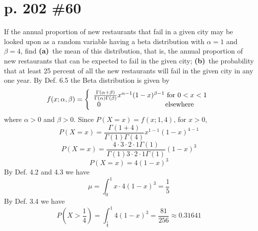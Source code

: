 \documentclass[12pt]{article}
\begin{document}
	\section[20pt]{p. 202 \#60}
	If the annual proportion of new restaurants that fail in a given city may be looked upon as a random variable having a beta distribution with \(\alpha=1\) and \(\beta=4\), find \newline
	\textbf{(a)}\ the mean of this distribution, that is, the annual proportion of new restaurants that can be expected to fail in the given city; \newline
	\textbf{(b)}\ the probability that at least 25 percent of all the new restaurants will fail in the given city in any one year. \newline \newline
	By Def. 6.5 the Beta distribution is given by
	\[f(x;\alpha,\beta)=\left\{\begin{array}{ccc}
	\frac{\Gamma(\alpha+\beta)}{\Gamma(\alpha)\Gamma(\beta)}x^{\alpha-1}(1-x)^{\beta-1} \textup{ for }0<x<1\\0 \ \ \ \ \ \ \ \ \ \ \ \ \ \ \ \ \ \ \ \ \ \ \ \ \ \ \ \ \textup{elsewhere} \ \ \ \ 
	\end{array}\right.\]
	where \(\alpha>0\) and \(\beta>0\).
	\newline \newline
	Since \(P(X=x)=f(x;1,4)\), for \(x>0\),
	\[P(X=x)=\frac{\Gamma(1+4)}{\Gamma(1)\Gamma(4)}x^{1-1}(1-x)^{4-1}\]
	\[P(X=x)=\frac{4\cdot3\cdot2\cdot1\Gamma(1)}{\Gamma(1)3\cdot2\cdot1\Gamma(1)}(1-x)^{3}\]
	\[P(X=x)=4(1-x)^{3}\]
	By Def. 4.2 and 4.3 we have
	\[\mu=\int_0^1x\cdot4(1-x)^{3}=\frac{1}{5}\]
	\newline \newline
	By Def. 3.4 we have
	\[P(X>\frac{1}{4})=\int_{\frac{1}{4}}^{1}4(1-x)^{3}=\frac{81}{256}\approx 0.31641\]
\end{document}

